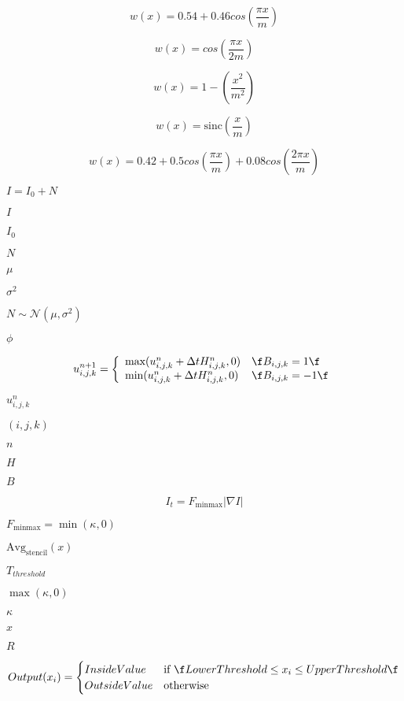 \documentclass{article}
\begin{document}
\[ w(x) = 0.54 + 0.46 cos(\frac{\pi x}{m} ) \]
\pagebreak

\[ w(x) = cos(\frac{\pi x}{2 m} ) \]
\pagebreak

\[ w(x) = 1 - ( \frac{x^2}{m^2} ) \]
\pagebreak

\[ w(x) = \textrm{sinc} ( \frac{x}{m} ) \]
\pagebreak

\[ w(x) = 0.42 + 0.5 cos(\frac{\pi x}{m}) + 0.08 cos(\frac{2 \pi x}{m}) \]
\pagebreak

$ I = I_0 + N $
\pagebreak

$ I $
\pagebreak

$ I_0 $
\pagebreak

$ N $
\pagebreak

$ \mu $
\pagebreak

$ \sigma^2 $
\pagebreak

$ N \sim \mathcal{N}(\mu, \sigma^2) $
\pagebreak

$ \phi $
\pagebreak

\[ u_{i,j,k}^{n+1} = \left\{ \begin{array}{ll} \mbox{max} (u_{i,j,k}^{n} + \Delta t H_{i,j,k}^{n}, 0) & \mbox{\f$B_{i,j,k} = 1\f$} \\ \mbox{min} (u_{i,j,k}^{n} + \Delta t H_{i,j,k}^{n}, 0) & \mbox{\f$B_{i,j,k} = -1\f$} \end{array}\right. \]
\pagebreak

$ u_{i,j,k}^{n} $
\pagebreak

$ (i,j,k) $
\pagebreak

$ n $
\pagebreak

$ H $
\pagebreak

$ B $
\pagebreak

\[ I_t = F_{\mbox{minmax}} |\nabla I| \]
\pagebreak

$ F_{\mbox{minmax}} = \min(\kappa,0) $
\pagebreak

$ \mbox{Avg}_{\mbox{stencil}}(x) $
\pagebreak

$ T_{threshold} $
\pagebreak

$ \max(\kappa,0) $
\pagebreak

$ \kappa $
\pagebreak

$ x $
\pagebreak

$ R $
\pagebreak

\[ Output(x_i) = \begin{cases} InsideValue & \text{if \f$LowerThreshold \leq x_i \leq UpperThreshold\f$} \\ OutsideValue & \text{otherwise} \end{cases} \]
\pagebreak
\end{document}
